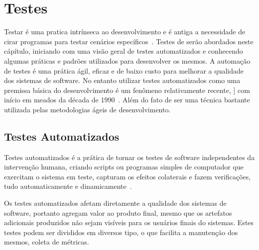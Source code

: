 \chapter{Testes}
\label{cap:testes}

Testar é uma pratica intrínseca ao desenvolvimento e é antiga a necessidade de
cirar programas para testar cenários específicos~\cite{everett2007}. Testes de 
serão abordados neste cápítulo, iniciando com uma visão geral de testes 
automatizados e conhecendo algumas práticas e padrões utilizados para desenvolver
os mesmos.
%
A automação de testes é uma prática ágil, eficaz e de baixo custo para melhorar
a qualidade dos sistemas de software. No entanto utilizar testes automatizados 
como uma premissa básica do desenvolvimento é um fenômeno relativamente recente, ]
com início em meados  da década de 1990~\cite{cotter1995}.
%
Além do fato de ser uma técnica bastante utilizada pelas metodologias ágeis
de desenvolvimento.


\section{Testes Automatizados}

Testes automatizados é a prática de tornar os testes de software independentes da
intervenção humana, criando scripts ou programas simples de computador que exercitam 
o sistema em teste, capturam os efeitos colaterais e fazem verificações, tudo 
automaticamente e dinamicamente~\cite{meszaros2007}.

Os testes automatizados afetam diretamente a qualidade dos sistemas de software,
portanto agregam valor  ao produto final, mesmo que os artefatos adicionais
produzidos não sejam visíveis para os usuários finais do sistemas.
%
Estes testes podem ser divididos em diversos tipo, o que facilita a manutenção 
dos mesmos, coleta de métricas.

